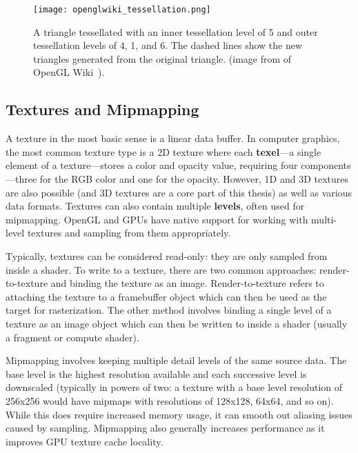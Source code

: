 \begin{figure}[h]
\centering
\texttt{[image: openglwiki\_tessellation.png]}
\caption{A triangle tessellated with an inner tessellation level of 5 and outer tessellation levels of 4, 1, and 6. The dashed lines show the new triangles generated from the original triangle. (image from of OpenGL Wiki~\cite{openglwiki_tessellation}).}
\label{fig:tessellation}
\end{figure}

\subsection{Textures and Mipmapping}
A texture in the most basic sense is a linear data buffer. In computer graphics, the most common texture type is a 2D texture where each \textbf{texel}---a single element of a texture---stores a color and opacity value, requiring four components---three for the RGB color and one for the opacity. However, 1D and 3D textures are also possible (and 3D textures are a core part of this thesis) as well as various data formats. Textures can also contain multiple \textbf{levels}, often used for mipmapping. OpenGL and GPUs have native support for working with multi-level textures and sampling from them appropriately.

Typically, textures can be considered read-only: they are only sampled from inside a shader. To write to a texture, there are two common approaches: render-to-texture and binding the texture as an image. Render-to-texture refers to attaching the texture to a framebuffer object which can then be used as the target for rasterization. The other method involves binding a single level of a texture as an image object which can then be written to inside a shader (usually a fragment or compute shader).

Mipmapping involves keeping multiple detail levels of the same source data. The base level is the highest resolution available and each successive level is downscaled (typically in powers of two: a texture with a base level resolution of 256x256 would have mipmaps with resolutions of 128x128, 64x64, and so on). While this does require increased memory usage, it can smooth out aliasing issues caused by sampling. Mipmapping also generally increases performance as it improves GPU texture cache locality.



